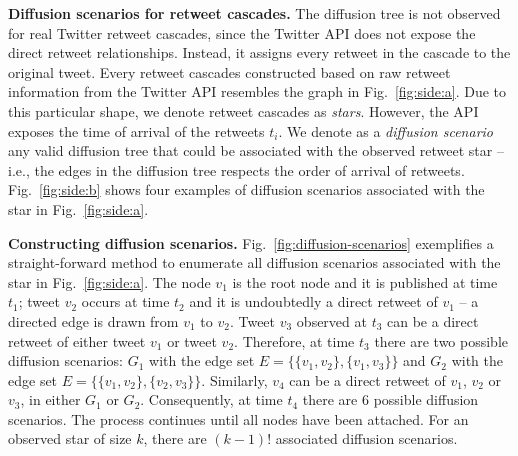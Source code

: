 \textbf{Diffusion scenarios for retweet cascades.}
The diffusion tree is not observed for real Twitter retweet cascades, since the Twitter API does not expose the direct retweet relationships.
Instead, it assigns every retweet in the cascade to the original tweet.
%
Every retweet cascades constructed based on raw retweet information from the Twitter API resembles the graph in Fig.~\ref{fig:side:a}.
Due to this particular shape, we denote retweet cascades as \emph{stars}.
However, the API exposes the time of arrival of the retweets $t_i$.
We denote as a \emph{diffusion scenario} any valid diffusion tree that could be associated with the observed retweet star -- i.e., the edges in the diffusion tree respects the order of arrival of retweets.
%
Fig.~\ref{fig:side:b} shows four examples of diffusion scenarios associated with the star in Fig.~\ref{fig:side:a}.


\textbf{Constructing diffusion scenarios.}
Fig.~\ref{fig:diffusion-scenarios} exemplifies a straight-forward method to enumerate all diffusion scenarios associated with the star in Fig.~\ref{fig:side:a}.
The node $v_1$ is the root node and it is published at time $t_1$;
tweet $v_2$ occurs at time $t_2$ and it is undoubtedly a direct retweet of $v_1$ -- a directed edge is drawn from $v_1$ to $v_2$. 
Tweet $v_3$ observed at $t_3$ can be a direct retweet of either tweet $v_1$ or tweet $v_2$.
Therefore, at time $t_3$ there are two possible diffusion scenarios: 
$G_1$ with the edge set $E = \lbrace \{v_1, v_2\}, \{v_1, v_3\} \rbrace$ and $G_2$ with the edge set $E = \lbrace \{v_1, v_2\}, \{v_2, v_3\} \rbrace$.
Similarly, $v_4$ can be a direct retweet of $v_1$, $v_2$ or $v_3$, in either $G_1$ or $G_2$.
Consequently, at time $t_4$ there are 6 possible diffusion scenarios.
The process continues until all nodes have been attached.
For an observed star of size $k$, there are $(k-1)!$ associated diffusion scenarios.

